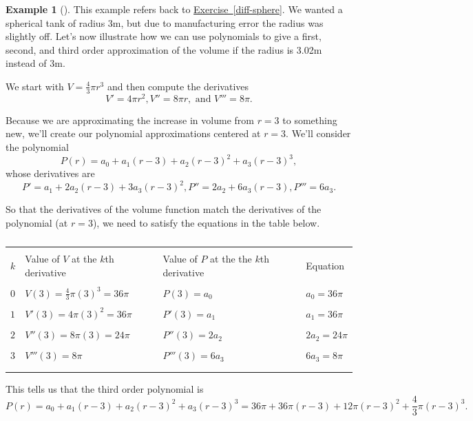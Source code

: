 \documentclass[10pt,]{book}
\theoremstyle{plain}
\theoremstyle{definition}
\theoremstyle{definition}
\theoremstyle{definition}
\newtheorem{example}[theorem]{Example}
\theoremstyle{definition}
\theoremstyle{definition}
\numberwithin{equation}{section}
\newcommand{\hrulethin}  {\noalign{\hrule height 0.04em}}
\begin{document}
\begin{example}[]\label{example-1}
This example refers back to \hyperref[diff-sphere]{Exercise~\ref{diff-sphere}}. We wanted a spherical tank of radius 3m, but due to manufacturing error the radius was slightly off. Let's now illustrate how we can use polynomials to give a first, second, and third order approximation of the volume if the radius is 3.02m instead of 3m.%
\par
We start with \(V=\frac{4}{3} \pi r^3\) and then compute the derivatives%
\begin{equation*}
V'=4\pi r^2, V''=8\pi r, \text{ and }  V'''=8\pi.
\end{equation*}
%
\par
Because we are approximating the increase in volume from \(r=3\) to something new, we'll create our polynomial approximations centered at \(r=3\). We'll consider the polynomial%
\begin{equation*}
P(r)=a_0+a_1(r-3)+a_2(r-3)^2+a_3(r-3)^3,
\end{equation*}
whose derivatives are%
\begin{equation*}
P'=a_1+2a_2(r-3)+3a_3(r-3)^2,
P''=2a_2+6a_3(r-3),
P'''=6a_3.
\end{equation*}
%
\par
So that the derivatives of the volume function match the derivatives of the polynomial (at \(r=3\)), we need to satisfy the equations in the table below.%
\begin{table}
\centering
\begin{tabular}{llll}
&&&\tabularnewline\hrulethin
\(k\)&Value of \(V\) at the \(k\)th derivative&Value of \(P\) at the the \(k\)th derivative&Equation\tabularnewline[0pt]
&&&\tabularnewline\hrulethin
\(0\)&\(V(3) = \frac{4}{3}\pi (3)^3 = 36\pi\)&\(P(3) = a_0\)&\(a_0=36\pi\)\tabularnewline[0pt]
&&&\tabularnewline\hrulethin
\(1\)&\(V'(3) = 4\pi (3)^2=36\pi\)&\(P'(3) = a_1\)&\(a_1=36\pi\)\tabularnewline[0pt]
&&&\tabularnewline\hrulethin
\(2\)&\(V''(3) = 8\pi (3)=24\pi\)&\(P''(3) = 2a_2\)&\(2a_2=24\pi\)\tabularnewline[0pt]
&&&\tabularnewline\hrulethin
\(3\)&\(V'''(3) = 8\pi\)&\(P'''(3) = 6a_3\)&\(6a_3=8\pi\)\tabularnewline[0pt]
&&&\tabularnewline\hrulethin
\end{tabular}
\caption{\label{table-1}}
\end{table}
This tells us that the third order polynomial is%
\begin{equation*}
P(r)=a_0+a_1(r-3)+a_2(r-3)^2+a_3(r-3)^3
=36\pi+36\pi(r-3)+12\pi(r-3)^2+\frac{4}{3}\pi(r-3)^3
.
\end{equation*}

\end{example}
\end{document}
